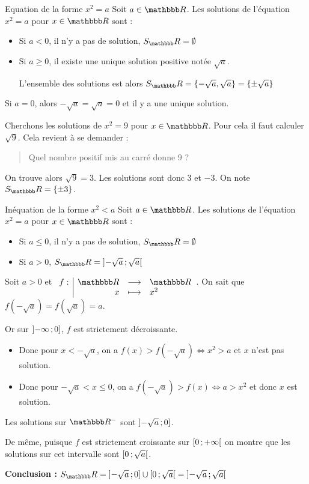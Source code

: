 \documentclass[10pt,a4paper,openany,twoside]{book}
\begin{document}
	\begin{prop}{Equation de la forme $x^2=a$}{}
		Soit $a\in\R$. Les solutions de l'équation $x^2=a$ pour $x\in\R$ sont :
		\begin{itemize}
			\item Si $a<0$, il n'y a pas de solution, $S_\R = \emptyset$
			\item Si $a \ge 0$, il existe une unique solution positive notée $\sqrt{a}$.

			L'ensemble des solutions est alors $S_\R = \{ -\sqrt{a}, \sqrt{a} \} =\{ \pm\sqrt{a} \}$
		\end{itemize}
	\end{prop}

	\begin{rem}{}{}
		Si $a=0$, alors $-\sqrt{a} = \sqrt{a} = 0$ et il y a une unique solution.
	\end{rem}

	\begin{ex}{}{}
		Cherchons les solutions de $x^2 = 9$ pour $x\in\R$. Pour cela il faut calculer $\sqrt{9}$. Cela revient à se demander :

		\begin{quotation}Quel nombre positif mis au carré donne 9 ?\end{quotation}

		On trouve alors $\sqrt{9}=3$. Les solutions sont donc $3$ et $-3$. On note $S_\R = \{ \pm 3 \}$.
	\end{ex}

	\begin{prop}{Inéquation de la forme $x^2 < a$}{}
		Soit $a\in\R$. Les solutions de l'équation $x^2=a$ pour $x\in\R$ sont :
		\begin{itemize}
			\item Si $a \le 0$, il n'y a pas de solution, $S_\R = \emptyset$
			\item Si $a > 0$, $S_\R = \oo{-\sqrt{a}}{\sqrt{a}}$
		\end{itemize}
	\end{prop}

	\begin{dem}{}{}
		Soit $a > 0$ et $\fonction{f}{\R}{\R}{x}{x^2}$.
		On sait que $f(-\sqrt{a}) = f(\sqrt{a}) = a$.

		\medskip
		Or sur $\mathopen{]}-\infty\mathclose{}\mathpunct{};0\mathclose{]}$, $f$ est strictement décroissante.

		\begin{itemize}
			\item Donc pour $x < -\sqrt{a}$, on a $f(x)>f(-\sqrt{a}) \iff x^2> a$ et $x$ n'est pas solution.
			\item Donc pour $-\sqrt{a} < x \le 0$, on a $f(-\sqrt{a})>f(x) \iff a > x^2$ et donc $x$ est solution.
		\end{itemize}
		Les solutions sur $\R^-$ sont $\mathopen{]}-\sqrt{a}\mathclose{}\mathpunct{};0\mathclose{]}$.

		\medskip
		De même, puisque $f$ est strictement croissante sur $\mathopen{[}0\mathclose{}\mathpunct{};+\infty\mathclose{[}$ on montre que les solutions sur cet intervalle sont $\mathopen{[}0\mathclose{}\mathpunct{};\sqrt{a}\mathclose{[}$.

		\bigskip
		\textbf{Conclusion :} $S_\R = \of{-\sqrt{a}}{0} \cup \fo{0}{\sqrt{a}} =\oo{-\sqrt{a}}{\sqrt{a}}$

	\end{dem}
\end{document}
